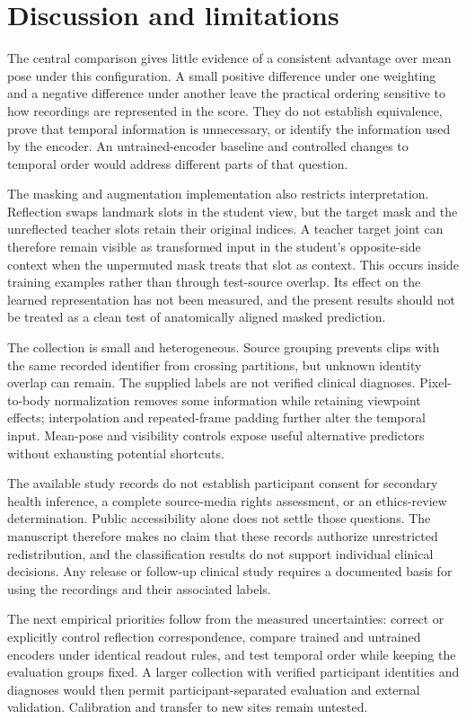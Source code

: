 \documentclass[10pt,twocolumn,letterpaper]{article}
\begin{document}
\section{Discussion and limitations}
The central comparison gives little evidence of a consistent advantage over mean pose under this configuration. A small positive difference under one weighting and a negative difference under another leave the practical ordering sensitive to how recordings are represented in the score. They do not establish equivalence, prove that temporal information is unnecessary, or identify the information used by the encoder. An untrained-encoder baseline and controlled changes to temporal order would address different parts of that question.

The masking and augmentation implementation also restricts interpretation. Reflection swaps landmark slots in the student view, but the target mask and the unreflected teacher slots retain their original indices. A teacher target joint can therefore remain visible as transformed input in the student's opposite-side context when the unpermuted mask treats that slot as context. This occurs inside training examples rather than through test-source overlap. Its effect on the learned representation has not been measured, and the present results should not be treated as a clean test of anatomically aligned masked prediction.

The collection is small and heterogeneous. Source grouping prevents clips with the same recorded identifier from crossing partitions, but unknown identity overlap can remain. The supplied labels are not verified clinical diagnoses. Pixel-to-body normalization removes some information while retaining viewpoint effects; interpolation and repeated-frame padding further alter the temporal input. Mean-pose and visibility controls expose useful alternative predictors without exhausting potential shortcuts.

The available study records do not establish participant consent for secondary health inference, a complete source-media rights assessment, or an ethics-review determination. Public accessibility alone does not settle those questions. The manuscript therefore makes no claim that these records authorize unrestricted redistribution, and the classification results do not support individual clinical decisions. Any release or follow-up clinical study requires a documented basis for using the recordings and their associated labels.

The next empirical priorities follow from the measured uncertainties: correct or explicitly control reflection correspondence, compare trained and untrained encoders under identical readout rules, and test temporal order while keeping the evaluation groups fixed. A larger collection with verified participant identities and diagnoses would then permit participant-separated evaluation and external validation. Calibration and transfer to new sites remain untested.
\end{document}
